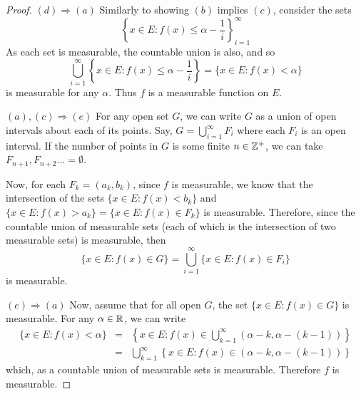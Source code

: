 \begin{pblm}
\begin{proof}
	\noindent $(d) \Rightarrow (a)$ 
	Similarly to showing $(b)$ implies $(c)$, consider the sets
	\begin{equation*}
		\left\{x \in E: f(x) \le \alpha - \frac{1}{i}\right\}_{i = 1}^\infty
	\end{equation*}
	As each set is measurable, the countable union is also, and so 
	\begin{equation*}
		\bigcup\limits_{i=1}^\infty\left\{x \in E: f(x) \le \alpha - \frac{1}{i}\right\} = 
		\{x \in E: f(x) < \alpha\}
	\end{equation*}
	is measurable for any $\alpha$. Thus $f$ is a measurable function on $E$.

	\noindent $(a),(c) \Rightarrow (e)$ For any open set $G$, we can write 
	$G$ as a union of open intervals about each of its points. Say, $G = \bigcup\limits_{i=1}^\infty F_i$ 
	where each $F_i$ is an open interval. If the number of points in $G$ is some finite $n \in \mathbb{Z}^+$, 
	we can take $F_{n+1}, F_{n+2} ... = \emptyset$. 

	Now, for each $F_k = (a_k, b_k)$, since $f$ is measurable, we know that the intersection of 
	the sets $\{x \in E: f(x) < b_k\}$ and $\{x \in E: f(x) > a_k\} = \{x \in E: f(x) \in F_k\}$ 
	is measurable. Therefore, since the countable union of measurable sets (each of which is 
	the intersection of two measurable sets) is measurable, then
	\begin{equation*}
		\{x \in E: f(x) \in G\} = \bigcup\limits_{i=1}^\infty \{x \in E: f(x) \in F_i\}
	\end{equation*}
	is measurable. 

	\noindent $(e) \Rightarrow (a)$ Now, assume that for all open $G$, 
	the set $\{x \in E: f(x) \in G\}$ is measurable. For any $\alpha \in \mathbb{R}$, 
	we can write 
	\begin{equation*}
		\begin{array}{rcl}
		\{x \in E: f(x) < \alpha\} & = & 
		\left\{x \in E: f(x) \in \bigcup\limits_{k=1}^\infty (\alpha - k, \alpha - (k - 1))\right\} \\
		& = & \bigcup\limits_{k=1}^\infty\left\{x \in E: f(x) \in (\alpha - k, \alpha - (k - 1))\right\}
		\end{array}
	\end{equation*}
	which, as a countable union of measurable sets is measurable. Therefore $f$ is measurable. 
\end{proof}
\end{pblm}

